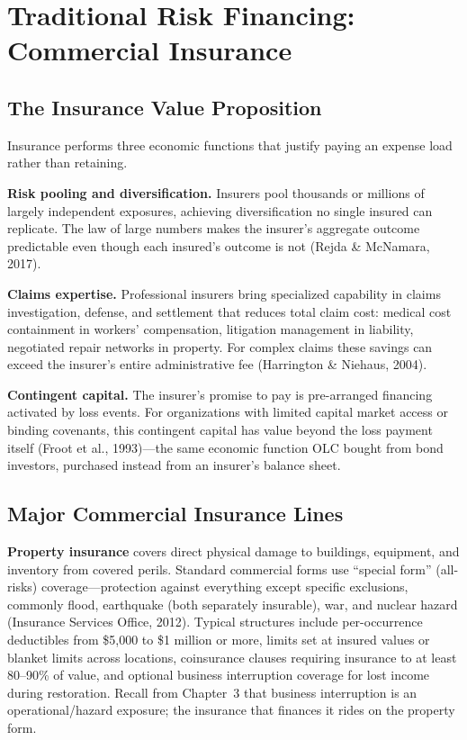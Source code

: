 \documentclass[11pt,openany]{book}
\begin{document}
\section{Traditional Risk Financing: Commercial Insurance}
\label{sec:commercial-insurance}

\subsection{The Insurance Value Proposition}

Insurance performs three economic functions that justify paying an expense
load rather than retaining.

\textbf{Risk pooling and diversification.} Insurers pool thousands or
millions of largely independent exposures, achieving diversification no
single insured can replicate. The law of large numbers makes the insurer's
aggregate outcome predictable even though each insured's outcome is not
(Rejda \& McNamara, 2017).

\textbf{Claims expertise.} Professional insurers bring specialized capability
in claims investigation, defense, and settlement that reduces total claim
cost: medical cost containment in workers' compensation, litigation
management in liability, negotiated repair networks in property. For complex
claims these savings can exceed the insurer's entire administrative fee
(Harrington \& Niehaus, 2004).

\textbf{Contingent capital.} The insurer's promise to pay is pre-arranged
financing activated by loss events. For organizations with limited capital
market access or binding covenants, this contingent capital has value beyond
the loss payment itself (Froot et al., 1993)---the same economic function OLC
bought from bond investors, purchased instead from an insurer's balance
sheet.

\subsection{Major Commercial Insurance Lines}
\label{subsec:lines}

\textbf{Property insurance} covers direct physical damage to buildings,
equipment, and inventory from covered perils. Standard commercial forms use
``special form'' (all-risks) coverage---protection against everything except
specific exclusions, commonly flood, earthquake (both separately insurable),
war, and nuclear hazard (Insurance Services Office, 2012). Typical structures
include per-occurrence deductibles from \$5,000 to \$1 million or more,
limits set at insured values or blanket limits across locations, coinsurance
clauses requiring insurance to at least 80--90\% of value, and optional
business interruption coverage for lost income during restoration. Recall
from Chapter~3 that business interruption is an
operational/hazard exposure; the insurance that finances it rides on the
property form.
\end{document}
